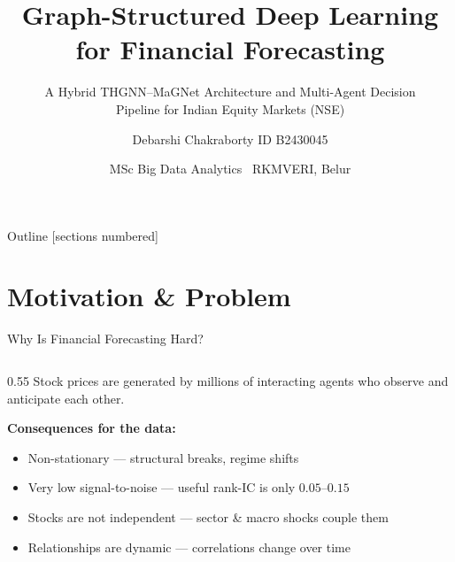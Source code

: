 \documentclass[aspectratio=169, 10pt]{beamer}
\title{Graph-Structured Deep Learning for Financial Forecasting}
\subtitle{A Hybrid THGNN--MaGNet Architecture and Multi-Agent Decision\\ Pipeline for Indian Equity Markets (NSE)}
\author{Debarshi Chakraborty \quad\textbar\quad ID B2430045}
\date{MSc Big Data Analytics \textbar\ RKMVERI, Belur}
\institute{Supervisor: Mr Champak Kumar Dutta \textbar\ Dept.\ of Computer Science}
\begin{document}
\maketitle

\begin{frame}{Outline}
  [sections numbered]
  \tableofcontents[hideallsubsections]
\end{frame}

\section{Motivation \& Problem}

\begin{frame}{Why Is Financial Forecasting Hard?}
  \begin{columns}[T]
    \begin{column}{0.55\textwidth}
      Stock prices are generated by \alert{millions of interacting agents}
      who observe and anticipate each other.

      \medskip
      \textbf{Consequences for the data:}
      \begin{itemize}\setlength{\itemsep}{3pt}
        \item Non-stationary — structural breaks, regime shifts
        \item \alert{Very low signal-to-noise} — useful rank-IC is only $0.05$--$0.15$
        \item Stocks are \alert{not independent} — sector \& macro shocks couple them
        \item Relationships are \alert{dynamic} — correlations change over time
      \end{itemize}


\end{column}
\end{columns}
\end{frame}
\end{document}
